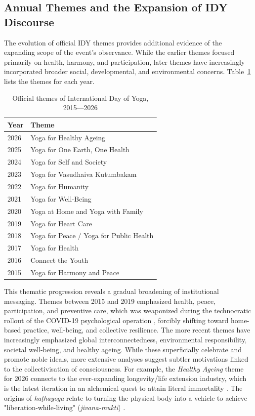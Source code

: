 \documentclass[11pt]{article}
\begin{document}
\subsection{Annual Themes and the Expansion of IDY Discourse}
The evolution of official IDY themes provides additional evidence of the expanding scope of the event's observance. While the earlier themes focused primarily on health, harmony, and participation, later themes have increasingly incorporated broader social, developmental, and environmental concerns. {Table~\ref{tab:idy_themes}} lists the themes for each year.

\begin{table}[H]
\centering
\caption{Official themes of International Day of Yoga, 2015––2026}
\label{tab:idy_themes}
\begin{tabular}{ll}
\toprule
Year & Theme \\
\midrule
2026 & Yoga for Healthy Ageing \\
2025 & Yoga for One Earth, One Health \\
2024 & Yoga for Self and Society \\
2023 & Yoga for Vasudhaiva Kutumbakam \\
2022 & Yoga for Humanity \\
2021 & Yoga for Well-Being \\
2020 & Yoga at Home and Yoga with Family \\
2019 & Yoga for Heart Care \\
2018 & Yoga for Peace / Yoga for Public Health \\
2017 & Yoga for Health \\
2016 & Connect the Youth \\
2015 & Yoga for Harmony and Peace \\
\bottomrule
\end{tabular}
\end{table}


This thematic progression reveals a gradual broadening of institutional messaging. Themes between 2015 and 2019 emphasized health, peace, participation, and preventive care, which was weaponized during the technocratic rollout of the COVID-19 psychological operation \cite{hughes2024}, forcibly shifting toward home-based practice, well-being, and collective resilience. The more recent themes have increasingly emphasized global interconnectedness, environmental responsibility, societal well-being, and healthy ageing. While these superficially celebrate and promote noble ideals, more extensive analyses suggest subtler motivations linked to the collectivisation of consciousness. For example, the \emph{Healthy Ageing} theme for 2026 connects to the ever-expanding longevity/life extension industry, which is the latest iteration in an alchemical quest to attain literal immortality \cite{mccartneyTranshumanist,mccartneyVedic,ferrandez2024,mccartneyalchemy}. The origins of \emph{ha\d{t}hayoga} relate to turning the physical body into a vehicle to achieve "liberation-while-living" (\emph{jivana-mukti}) \cite{mccartneyalchemy}.
\end{document}
